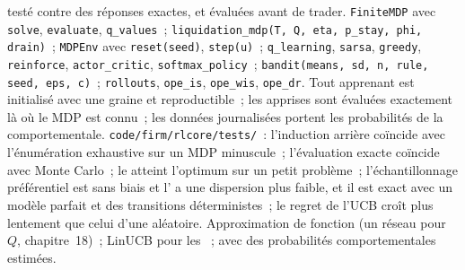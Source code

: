 \begin{build}
  testé contre des réponses exactes, et  évaluées avant de trader.
 \texttt{FiniteMDP} avec \texttt{solve}, \texttt{evaluate}, \texttt{q\_values}~;
\texttt{liquidation\_mdp(T, Q, eta, p\_stay, phi, drain)}~; \texttt{MDPEnv} avec \texttt{reset(seed)}, \texttt{step(u)}~;
\texttt{q\_learning}, \texttt{sarsa}, \texttt{greedy}, \texttt{reinforce}, \texttt{actor\_critic}, \texttt{softmax\_policy}~;
\texttt{bandit(means, sd, n, rule, seed, eps, c)}~; \texttt{rollouts}, \texttt{ope\_is}, \texttt{ope\_wis}, \texttt{ope\_dr}.
 Tout apprenant est initialisé avec une graine et reproductible~; les  apprises sont évaluées exactement là où le MDP est connu~;
les données journalisées portent les probabilités de la  comportementale.
 \texttt{code/firm/rlcore/tests/}~: l'induction arrière coïncide avec l'énumération exhaustive sur un MDP minuscule~;
l'évaluation exacte coïncide avec Monte Carlo~; le  atteint l'optimum sur un petit problème~; l'échantillonnage préférentiel est sans biais
et l' a une dispersion plus faible, et il est exact avec un modèle parfait et des transitions déterministes~; le regret de l'UCB croît plus lentement que celui d'une  aléatoire.
 Approximation de fonction (un réseau pour $Q$, chapitre~18)~; LinUCB pour les ~; 
avec des probabilités comportementales estimées.
\end{build}

